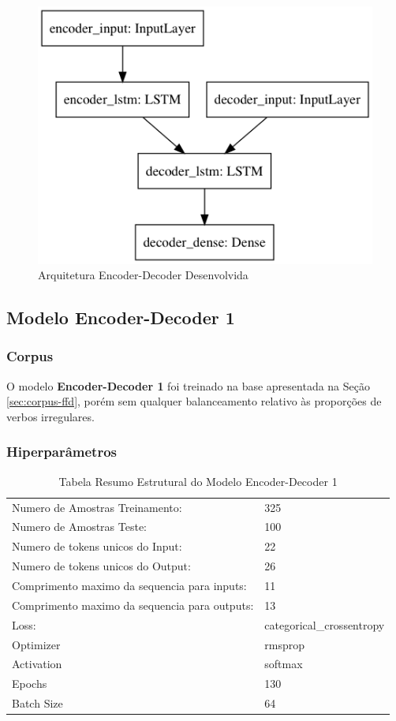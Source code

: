 
\begin{figure}[H]
  \centering
  \includegraphics[width=0.5\linewidth]{img/draw-model6.png}
  \caption{Arquitetura Encoder-Decoder Desenvolvida}
  \label{fig:encdec}
\end{figure}


\subsection{Modelo Encoder-Decoder 1} 

\subsubsection{Corpus}
O modelo \textbf{Encoder-Decoder 1} foi treinado na base apresentada na Seção \ref{sec:corpus-ffd}, porém sem qualquer balanceamento relativo às proporções de verbos irregulares.

\subsubsection{Hiperparâmetros} 

\begin{table}[H]
\centering
\begin{tabular}{ll}
Numero de Amostras Treinamento: & 325 \\
Numero de Amostras Teste: & 100 \\
Numero de tokens unicos do Input: & 22 \\
Numero de tokens unicos do Output: & 26 \\
Comprimento maximo da sequencia para inputs: & 11 \\
Comprimento maximo da sequencia para outputs: & 13 \\
Loss: & categorical\_crossentropy \\
Optimizer & rmsprop \\
Activation & softmax \\
Epochs & 130 \\
Batch Size & 64
\end{tabular}
\caption{Tabela Resumo Estrutural do Modelo Encoder-Decoder 1}
\label{tab:resumo2}
\end{table}

